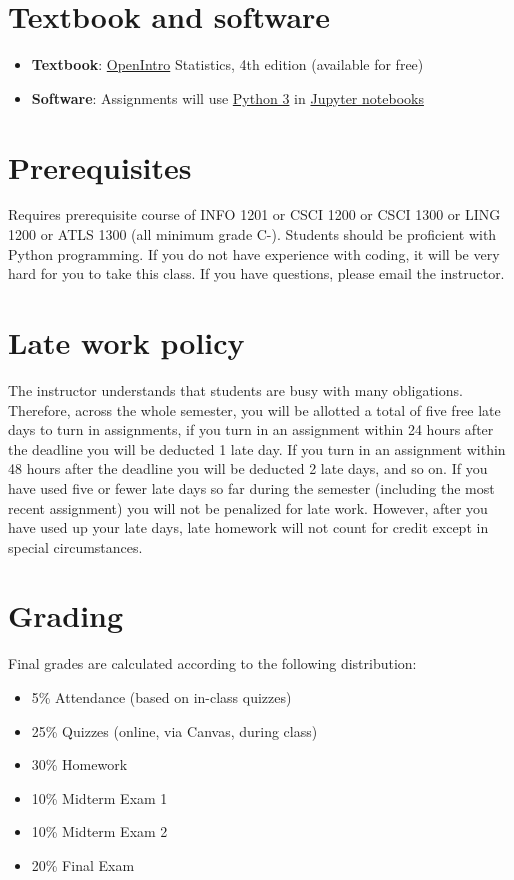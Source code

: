 \documentclass[10pt]{memoir}
\begin{document}
\section{\textbf{Textbook and software }}

\begin{itemize}
\item \textbf{Textbook}: \href{https://www.abehandler.com/resources/openintro-statistics.pdf}{OpenIntro} Statistics, 4th edition (available for free)
\item \textbf{Software}: Assignments will use \href{https://www.python.org/}{Python 3} in \href{https://jupyter.org/}{Jupyter notebooks}
\end{itemize}

\section{\textbf{Prerequisites}}

Requires prerequisite course of INFO 1201 or CSCI 1200 or CSCI 1300 or LING 1200 or ATLS 1300 (all minimum grade C-). Students should be proficient with Python programming. If you do not have experience with coding, it will be very hard for you to take this class. If you have questions, please email the instructor.

\section{\textbf{Late work policy}}
The instructor understands that students are busy with many obligations. Therefore, across the whole semester, you will be allotted a total of five free late days to turn in assignments, if you turn in an assignment within 24 hours after the deadline you will be deducted 1 late day. If you turn in an assignment within 48 hours after the deadline you will be deducted 2 late days, and so on. If you have used five or fewer late days so far during the semester (including the most recent assignment) you will not be penalized for late work. However, after you have used up your late days, late homework will not count for credit except in special circumstances.

\section{\textbf{Grading}}

Final grades are calculated according to the following distribution:
\begin{itemize}
\item 5\% Attendance (based on in-class quizzes)
\item 25\% Quizzes (online, via Canvas, during class)
\item 30\% Homework
\item 10\% Midterm Exam 1
\item 10\% Midterm Exam 2
\item 20\% Final Exam
\end{itemize}
\end{document}
